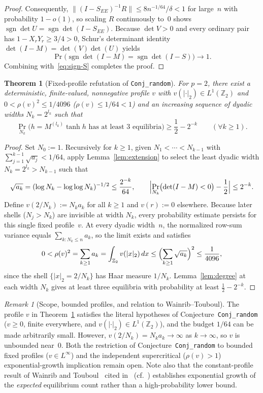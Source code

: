 \documentclass[11pt]{article}
\theoremstyle{plain}
\newtheorem{theorem}{Theorem}
\theoremstyle{definition}
\theoremstyle{remark}
\newtheorem{remark}{Remark}
\DeclareMathOperator{\sgn}{sgn}
\begin{document}
\begin{proof}
Consequently, $\|(I - S_{EE})^{-1} R\| \le 8n^{-1/64}/\delta < 1$ for large~$n$ with probability $1 - o(1)$, so scaling $R$ continuously to~$0$ shows $\sgn\det U = \sgn\det(I - S_{EE})$. Because $\det V > 0$ and every ordinary pair has $1 - X_r Y_r \ge 3/4 > 0$, Schur's determinant identity $\det(I - M) = \det(V)\det(U)$ yields
\[
\Pr\bigl(\sgn\det(I - M) = \sgn\det(I - S)\bigr) \longrightarrow 1.
\]
Combining with~\eqref{eq:sign-S} completes the proof.
\end{proof}

\begin{theorem}[Fixed-profile refutation of \texttt{Conj\_random}]\label{thm:random}
For $p = 2$, there exist a deterministic, finite-valued, nonnegative profile $v$ with $v(|\cdot|_2) \in L^1(\mathbb{Z}_2)$ and $0 < \rho(v)^2 \le 1/4096$ ($\rho(v) \le 1/64 < 1$) and an increasing sequence of dyadic widths $N_k = 2^{l_k}$ such that
\[
\Pr_{N_k}\bigl(h = M^{(l_k)}\tanh h \text{ has at least } 3 \text{ equilibria}\bigr) \ge \frac{1}{2} - 2^{-k} \qquad (\forall k \ge 1).
\]
\end{theorem}

\begin{proof}
Set $N_0 := 1$. Recursively for $k \ge 1$, given $N_1 < \cdots < N_{k-1}$ with $\sum_{j=1}^{k-1} \sqrt{a_j} < 1/64$, apply Lemma~\ref{lem:extension} to select the least dyadic width $N_k = 2^{l_k} > N_{k-1}$ such that
\[
\sqrt{a_k} = (\log N_k - \log\log N_k)^{-1/2} \le \frac{2^{-k}}{64}, \qquad
\Bigl|\Pr_{N_k}\bigl(\det(I - M) < 0\bigr) - \frac{1}{2}\Bigr| \le 2^{-k}.
\]
Define $v(2/N_k) := N_k a_k$ for all $k \ge 1$ and $v(r) := 0$ elsewhere. Because later shells ($N_j > N_k$) are invisible at width $N_k$, every probability estimate persists for this single fixed profile~$v$. At every dyadic width~$n$, the normalized row-sum variance equals $\sum_{k : N_k \le n} a_k$, so the limit exists and satisfies
\[
0 < \rho(v)^2 = \sum_{k \ge 1} a_k = \int_{\mathbb{Z}_2} v(|x|_2)\,dx \le \Bigl(\sum_{k \ge 1} \sqrt{a_k}\Bigr)^2 \le \frac{1}{4096},
\]
since the shell $\{|x|_2 = 2/N_k\}$ has Haar measure $1/N_k$. Lemma~\ref{lem:degree} at each width $N_k$ gives at least three equilibria with probability at least $\frac{1}{2} - 2^{-k}$.
\end{proof}

\begin{remark}[Scope, bounded profiles, and relation to Wainrib--Touboul]
The profile $v$ in Theorem~\ref{thm:random} satisfies the literal hypotheses of Conjecture~\texttt{Conj\_random} ($v \ge 0$, finite everywhere, and $v(|\cdot|_2) \in L^1(\mathbb{Z}_2)$), and the budget $1/64$ can be made arbitrarily small. However, $v(2/N_k) = N_k a_k \to \infty$ as $k \to \infty$, so $v$ is unbounded near~$0$. Both the restriction of Conjecture~\texttt{Conj\_random} to bounded fixed profiles ($v \in L^\infty$) and the independent supercritical ($\rho(v) > 1$) exponential-growth implication remain open. Note also that the constant-profile result of Wainrib and Touboul~\cite{wainrib2013} cited in~\cite{zuniga2026} (cf.~\cite{sompolinsky1988}) establishes exponential growth of the \emph{expected} equilibrium count rather than a high-probability lower bound.
\end{remark}
\end{document}
